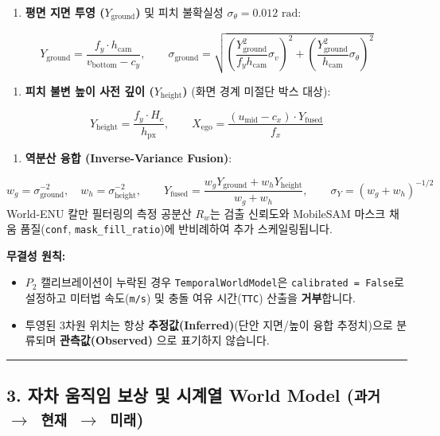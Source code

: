 \documentclass[10.5pt,a4paper]{article}
\begin{document}
\begin{enumerate}[leftmargin=1.8em,itemsep=2pt]
\item \textbf{평면 지면 투영 ($Y_{\text{ground}}$)} 및 피치 불확실성 $\sigma_\theta = 0.012\text{ rad}$:
\end{enumerate}
\[Y_{\text{ground}} = \frac{f_y \cdot h_{\text{cam}}}{v_{\text{bottom}} - c_y}, \qquad \sigma_{\text{ground}} = \sqrt{\left(\frac{Y_{\text{ground}}^2}{f_y h_{\text{cam}}}\sigma_v\right)^2 + \left(\frac{Y_{\text{ground}}^2}{h_{\text{cam}}}\sigma_\theta\right)^2}\]
\begin{enumerate}[leftmargin=1.8em,itemsep=2pt]
\item \textbf{피치 불변 높이 사전 깊이 ($Y_{\text{height}}$)} (화면 경계 미절단 박스 대상):
\end{enumerate}
\[Y_{\text{height}} = \frac{f_y \cdot H_c}{h_{\text{px}}}, \qquad X_{\text{ego}} = \frac{(u_{\text{mid}} - c_x) \cdot Y_{\text{fused}}}{f_x}\]
\begin{enumerate}[leftmargin=1.8em,itemsep=2pt]
\item \textbf{역분산 융합 (Inverse-Variance Fusion)}:
\end{enumerate}
\[w_g = \sigma_{\text{ground}}^{-2}, \quad w_h = \sigma_{\text{height}}^{-2}, \qquad Y_{\text{fused}} = \frac{w_g Y_{\text{ground}} + w_h Y_{\text{height}}}{w_g + w_h}, \qquad \sigma_Y = (w_g + w_h)^{-1/2}\]
World-ENU 칼만 필터링의 측정 공분산 $R_w$는 검출 신뢰도와 MobileSAM 마스크 채움 품질(\texttt{conf}, \texttt{mask\_\allowbreak{}fill\_\allowbreak{}ratio})에 반비례하여 추가 스케일링됩니다.


\textbf{무결성 원칙:}

\begin{itemize}[leftmargin=1.5em,itemsep=2pt]
\item $P_2$ 캘리브레이션이 누락된 경우 \texttt{TemporalWorldModel}은 \texttt{calibrated = False}로 설정하고 미터법 속도(\texttt{m/\allowbreak{}s}) 및 충돌 여유 시간(\texttt{TTC}) 산출을 \textbf{거부}합니다.
\item 투영된 3차원 위치는 항상 \textbf{추정값(Inferred)}(단안 지면/높이 융합 추정치)으로 분류되며 \textbf{관측값(Observed)} 으로 표기하지 않습니다.
\end{itemize}

\par\noindent\rule{\textwidth}{0.4pt}\par\medskip

\subsection{3. 자차 움직임 보상 및 시계열 World Model (\texttt{과거 $\rightarrow$ 현재 $\rightarrow$ 미래})}
\end{document}
